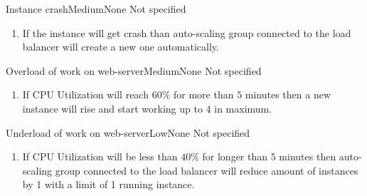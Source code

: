 \begin{testcase}{Instance crash}{Medium}{None}
	{
		Not specified
	}
	{
		\begin{enumerate}
			\item If the instance will get crash than auto-scaling group connected to the load balancer will create a new one automatically.
		\end{enumerate}
	}
\end{testcase}

\begin{testcase}{Overload of work on web-server}{Medium}{None}
	{
		Not specified
	}
	{
		\begin{enumerate}
			\item If CPU Utilization will reach $60\%$ for more than $5$ minutes then a new instance will rise and start working up to 4 in maximum.
		\end{enumerate}
	}
\end{testcase}

\begin{testcase}{Underload of work on web-server}{Low}{None}
	{
		Not specified
	}
	{
		\begin{enumerate}
			\item If CPU Utilization will be less than $40\%$ for longer than $5$ minutes then auto-scaling group connected to the load balancer will reduce amount of instances by 1 with a limit of 1 running instance.
		\end{enumerate}
	}
\end{testcase}